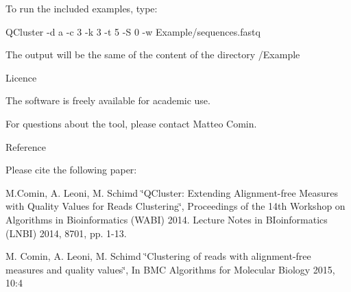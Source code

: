 To run the included examples, type\+:

QCluster -\/d a -\/c 3 -\/k 3 -\/t 5 -\/S 0 -\/w Example/sequences.\+fastq

The output will be the same of the content of the directory /\+Example

Licence

The software is freely available for academic use.

For questions about the tool, please contact Matteo Comin.

Reference

Please cite the following paper\+:

M.\+Comin, A. Leoni, M. Schimd \char`\"{}\+QCluster\+: Extending Alignment-\/free Measures with Quality Values for Reads Clustering\char`\"{}, Proceedings of the 14th Workshop on Algorithms in Bioinformatics (WABI) 2014. Lecture Notes in BIoinformatics (LNBI) 2014, 8701, pp. 1-\/13.

M. Comin, A. Leoni, M. Schimd \char`\"{}\+Clustering of reads with alignment-\/free measures and quality values\char`\"{}, In BMC Algorithms for Molecular Biology 2015, 10\+:4 